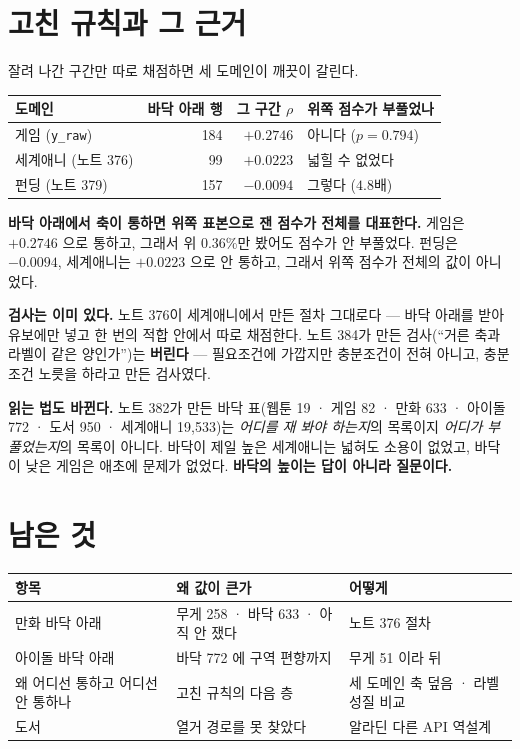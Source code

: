 \documentclass[11pt]{article}
\begin{document}
\section{고친 규칙과 그 근거}

잘려 나간 구간만 따로 채점하면 세 도메인이 깨끗이 갈린다.

\begin{center}
\begin{tabular}{lrrl}
\hline
도메인 & 바닥 아래 행 & 그 구간 $\rho$ & 위쪽 점수가 부풀었나 \\
\hline
게임 (\texttt{y\_raw}) & 184 & $\mathbf{+0.2746}$ & 아니다 ($p=0.794$) \\
세계애니 (노트 376) & 99 & $+0.0223$ & 넓힐 수 없었다 \\
펀딩 (노트 379) & 157 & $\mathbf{-0.0094}$ & 그렇다 ($4.8$배) \\
\hline
\end{tabular}
\end{center}

\textbf{바닥 아래에서 축이 통하면 위쪽 표본으로 잰 점수가 전체를
대표한다.} 게임은 $+0.2746$ 으로 통하고, 그래서 위 0.36\%만 봤어도 점수가
안 부풀었다. 펀딩은 $-0.0094$, 세계애니는 $+0.0223$ 으로 안 통하고,
그래서 위쪽 점수가 전체의 값이 아니었다.

\textbf{검사는 이미 있다.} 노트 376이 세계애니에서 만든 절차 그대로다 ---
바닥 아래를 받아 유보에만 넣고 한 번의 적합 안에서 따로 채점한다. 노트
384가 만든 검사(``거른 축과 라벨이 같은 양인가'')는 \textbf{버린다} ---
필요조건에 가깝지만 충분조건이 전혀 아니고, 충분조건 노릇을 하라고 만든
검사였다.

\textbf{읽는 법도 바뀐다.} 노트 382가 만든 바닥 표(웹툰 19 · 게임 82 ·
만화 633 · 아이돌 772 · 도서 950 · 세계애니 19,533)는 \emph{어디를 재
봐야 하는지}의 목록이지 \emph{어디가 부풀었는지}의 목록이 아니다. 바닥이
제일 높은 세계애니는 넓혀도 소용이 없었고, 바닥이 낮은 게임은 애초에
문제가 없었다. \textbf{바닥의 높이는 답이 아니라 질문이다.}

\section{남은 것}

\begin{center}
\begin{tabular}{lll}
\hline
항목 & 왜 값이 큰가 & 어떻게 \\
\hline
만화 바닥 아래 & 무게 258 · 바닥 633 · 아직 안 쟀다 & 노트 376 절차 \\
아이돌 바닥 아래 & 바닥 772 에 구역 편향까지 & 무게 51 이라 뒤 \\
왜 어디선 통하고 어디선 안 통하나 & 고친 규칙의 다음 층 & 세 도메인 축 덮음 · 라벨 성질 비교 \\
도서 & 열거 경로를 못 찾았다 & 알라딘 다른 API 역설계 \\
\hline
\end{tabular}
\end{center}
\end{document}
